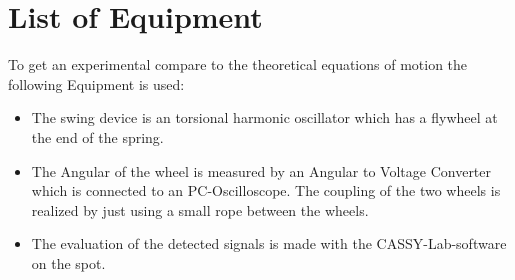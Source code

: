 \newpage
\section{List of Equipment}
To get an experimental compare to the theoretical equations of motion the following Equipment is used:
\begin{itemize}
\item The swing device is an torsional harmonic oscillator which has a flywheel at the end of the spring.
\item The Angular of the wheel is measured by an Angular to Voltage Converter which is connected to an PC-Oscilloscope. The coupling of the two wheels is realized by just using a small rope between the wheels.
\item The evaluation of the detected signals is made with the CASSY-Lab-software on the spot. 
\end{itemize}